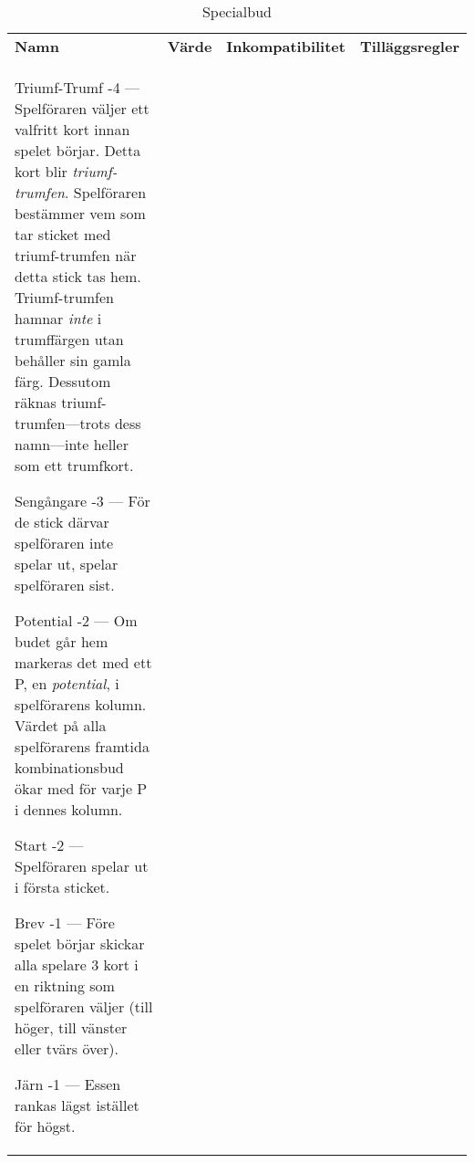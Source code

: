 %
%
%
%

\begin{table}
	\caption{Specialbud}\label{tab:specialBids}
	\begin{center}
		\begin{tabularx}{\textwidth}{
			l
			S[table-number-alignment=center, table-figures-decimal=0]
			p{3cm}
			|X
		}
			\textbf{Namn} &
			\textbf{Värde} &
			\textbf{Inkompatibilitet} &
			\textbf{Tilläggsregler}
			\\[-3ex]

			\specialBidItem%
			{Triumf-Trumf}
			{-4}
			{---}
			{%
				Spelföraren väljer ett valfritt kort innan spelet börjar. Detta kort blir \emph{triumf-trumfen}. Spelföraren bestämmer vem som tar sticket med triumf-trumfen när detta stick tas hem. Triumf-trumfen hamnar \emph{inte} i trumffärgen utan behåller sin gamla färg. Dessutom räknas triumf-trumfen---trots dess namn---inte heller som ett trumfkort.
			}

			\specialBidItem%
			{Sengångare}
			{-3}
			{---}
			{%
				För de stick därvar spelföraren inte spelar ut, spelar spelföraren sist.
			}

			\specialBidItem%
			{Potential}
			{-2}
			{---}
			{%
				Om budet går hem markeras det med ett P, en \emph{potential}, i spelförarens kolumn. Värdet på alla spelförarens framtida kombinationsbud ökar med  för varje P i dennes kolumn.
			}

			\specialBidItem%
			{Start}
			{-2}
			{---}
			{%
				Spelföraren spelar ut i första sticket.
			}

			\specialBidItem%
			{Brev}
			{-1}
			{---}
			{%
				Före spelet börjar skickar alla spelare 3 kort i en riktning som spelföraren väljer (till höger, till vänster eller tvärs över).
			}

			\specialBidItem%
			{Järn}
			{-1}
			{---}
			{%
				Essen rankas lägst istället för högst.
			}


\end{tabularx}
\end{center}
\end{table}
